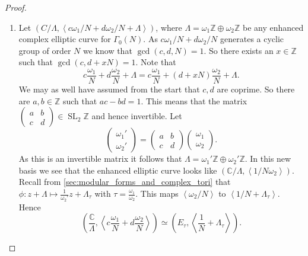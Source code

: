 \documentclass[a4paper]{article}
\theoremstyle{theoremdd}
\theoremstyle{definitiondd}
\theoremstyle{remarkdd}
\newcommand{\Z}{\mathbb{Z}}
\newcommand{\C}{\mathbb{C}}
\DeclareMathOperator{\SL}{SL}
\begin{document}
\begin{proof}
	\begin{enumerate}
		\item Let $\left( C / \Lambda, \left< c \omega_1 / N  + d \omega_2 / N  + \Lambda\right> \right) $, where $\Lambda = \omega_1 \Z \oplus \omega_2 \Z$ be any enhanced complex elliptic curve for $\Gamma_0(N)$.
			As $c \omega_1 / N + d \omega_2 /N$ generates a cyclic group of order $N$ we know that $\gcd(c, d, N) = 1$. 
			So there exists an $x \in \Z$ such that $\gcd(c, d + xN) = 1$. 
			Note that \[
				c \frac{\omega_1}{N}  + d \frac{\omega_2}{N}  + \Lambda =  c \frac{\omega_1}{N} + (d + xN) \frac{\omega_2}{N}+ \Lambda
		.\]
		We may as well have assumed from the start that $c, d$ are coprime.
		So there are $a, b \in \Z $ such that $ac - bd = 1$. 
		This means that the matrix  $\begin{pmatrix} a & b \\ c& d \end{pmatrix}  \in \SL_2\Z$ and hence invertible. 
		Let \[
		\begin{pmatrix} \omega_1' \\ \omega_2' \end{pmatrix}  = 
		\begin{pmatrix} a & b \\ c & d \end{pmatrix} 
		\begin{pmatrix} \omega_1 \\ \omega_2 \end{pmatrix} 
		.\] 
		As this is an invertible matrix it follows that $\Lambda = \omega_1' \Z \oplus \omega_2' \Z$. 
	In this new basis we see that the enhanced elliptic curve looks like $(\C / \Lambda, \left< 1 / N \omega_2\right>)$.
	Recall from \cref{sec:modular_forms_and_complex_tori} that  $\phi: z  + \Lambda \mapsto  \frac{1}{\omega_2'} z + \Lambda_\tau$ with $\tau = \frac{\omega_1}{\omega_2}$. 
	This maps  $\left<\omega_2 / N \right>$ to $\left<1 / N + \Lambda_\tau \right>$.
	Hence  \[
		\left( \frac{\C}{\Lambda}, \left<c \frac{\omega_1}{N} + d \frac{\omega_2}{N} \right> \right) 	\simeq  
		\left( E_\tau, \left<\frac{1}{N} + \Lambda_\tau \right> \right) 
	.\] 



\end{enumerate}
\end{proof}
\end{document}
